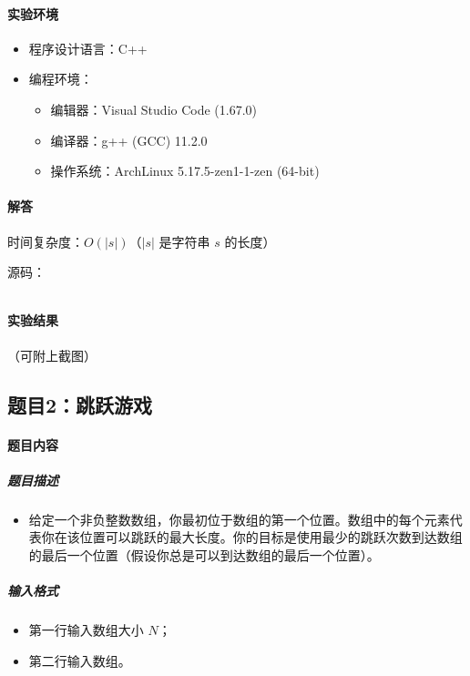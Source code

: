 \documentclass[12pt,a4paper]{ctexart}
\begin{document}
\paragraph{实验环境}
\begin{itemize}
    \item 程序设计语言：C++
    \item 编程环境：
    \begin{itemize}
        \item 编辑器：Visual Studio Code (1.67.0)
        \item 编译器：g++ (GCC) 11.2.0
        \item 操作系统：ArchLinux 5.17.5-zen1-1-zen (64-bit)
    \end{itemize}
\end{itemize}

\vspace{5pt}

\paragraph{解答} 时间复杂度：$O(|s|)$（$|s|$ 是字符串 $s$ 的长度）

源码：
\inputminted[bgcolor=codebg,frame=lines,autogobble,linenos=true,breaklines]{cpp}{src/t1.cpp}

\vspace{5pt}

\paragraph{实验结果}
（可附上截图）

\newpage

\subsection*{题目2：跳跃游戏}
\paragraph{题目内容}
\subparagraph{题目描述}
\begin{itemize}
    \item 给定一个非负整数数组，你最初位于数组的第一个位置。数组中的每个元素代表你在该位置可以跳跃的最大长度。你的目标是使用最少的跳跃次数到达数组的最后一个位置（假设你总是可以到达数组的最后一个位置）。
\end{itemize}

\subparagraph{输入格式}
    \begin{itemize}
        \item 第一行输入数组大小 $N$；
        \item 第二行输入数组。
    \end{itemize}
\end{document}
